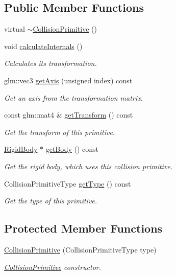 \subsection*{Public Member Functions}
\begin{DoxyCompactItemize}
\item 
virtual \mbox{\hyperlink{classr3_1_1_collision_primitive_adfa75f14067cb33a3f0049895a3db880}{$\sim$\+Collision\+Primitive}} ()
\item 
void \mbox{\hyperlink{classr3_1_1_collision_primitive_ae27cb70a6812491c2d8de97f22c07ac6}{calculate\+Internals}} ()
\begin{DoxyCompactList}\small\item\em Calculates its transformation. \end{DoxyCompactList}\item 
glm\+::vec3 \mbox{\hyperlink{classr3_1_1_collision_primitive_a78c959f5ca0a09a0fc2038ac7f30e45a}{get\+Axis}} (unsigned index) const
\begin{DoxyCompactList}\small\item\em Get an axis from the transformation matrix. \end{DoxyCompactList}\item 
const glm\+::mat4 \& \mbox{\hyperlink{classr3_1_1_collision_primitive_acc4e2139c698bab280338db36d7cc586}{get\+Transform}} () const
\begin{DoxyCompactList}\small\item\em Get the transform of this primitive. \end{DoxyCompactList}\item 
\mbox{\hyperlink{classr3_1_1_rigid_body}{Rigid\+Body}} $\ast$ \mbox{\hyperlink{classr3_1_1_collision_primitive_af8dbda90cce34a6262309cbdb75feea7}{get\+Body}} () const
\begin{DoxyCompactList}\small\item\em Get the rigid body, which uses this collision primitive. \end{DoxyCompactList}\item 
Collision\+Primitive\+Type \mbox{\hyperlink{classr3_1_1_collision_primitive_ac7a318fb788d1442e7d3390c8e465e14}{get\+Type}} () const
\begin{DoxyCompactList}\small\item\em Get the type of this primitive. \end{DoxyCompactList}\end{DoxyCompactItemize}
\subsection*{Protected Member Functions}
\begin{DoxyCompactItemize}
\item 
\mbox{\hyperlink{classr3_1_1_collision_primitive_a56f4cef84fcb4d92b0ced2ffcefdb22a}{Collision\+Primitive}} (Collision\+Primitive\+Type type)
\begin{DoxyCompactList}\small\item\em \mbox{\hyperlink{classr3_1_1_collision_primitive}{Collision\+Primitive}} constructor. \end{DoxyCompactList}\end{DoxyCompactItemize}
